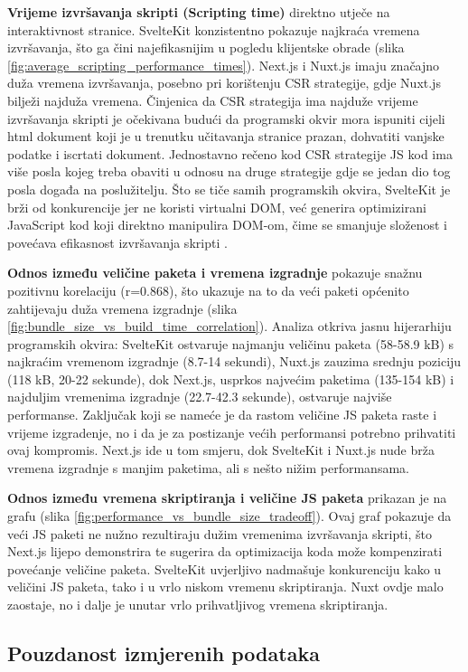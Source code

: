 \textbf{Vrijeme izvršavanja skripti (Scripting time)} direktno utječe na interaktivnost stranice. SvelteKit konzistentno pokazuje najkraća vremena izvršavanja, što ga čini najefikasnijim u pogledu klijentske obrade (slika \ref{fig:average_scripting_performance_times}). Next.js i Nuxt.js imaju značajno duža vremena izvršavanja, posebno pri korištenju CSR strategije, gdje Nuxt.js bilježi najduža vremena. Činjenica da CSR strategija ima najduže vrijeme izvršavanja skripti je očekivana budući da programski okvir mora ispuniti cijeli html dokument koji je u trenutku učitavanja stranice prazan, dohvatiti vanjske podatke i iscrtati dokument. Jednostavno rečeno kod CSR strategije JS kod ima više posla kojeg treba obaviti u odnosu na druge strategije gdje se jedan dio tog posla događa na poslužitelju. Što se tiče samih programskih okvira, SvelteKit je brži od konkurencije jer ne koristi virtualni DOM, već generira optimizirani JavaScript kod koji direktno manipulira DOM-om, čime se smanjuje složenost i povećava efikasnost izvršavanja skripti \cite{svelte2019reactivity}.


\textbf{Odnos između veličine paketa i vremena izgradnje} pokazuje snažnu pozitivnu korelaciju (r=0.868), što ukazuje na to da veći paketi općenito zahtijevaju duža vremena izgradnje (slika \ref{fig:bundle_size_vs_build_time_correlation}). Analiza otkriva jasnu hijerarhiju programskih okvira: SvelteKit ostvaruje najmanju veličinu paketa (58-58.9 kB) s najkraćim vremenom izgradnje (8.7-14 sekundi), Nuxt.js zauzima srednju poziciju (118 kB, 20-22 sekunde), dok Next.js, usprkos najvećim paketima (135-154 kB) i najduljim vremenima izgradnje (22.7-42.3 sekunde), ostvaruje najviše performanse.
Zaključak koji se nameće je da rastom veličine JS paketa raste i vrijeme izgradenje, no i da je za postizanje većih performansi potrebno prihvatiti ovaj kompromis. Next.js ide u tom smjeru, dok SvelteKit i Nuxt.js nude brža vremena izgradnje s manjim paketima, ali s nešto nižim performansama.

\textbf{Odnos između vremena skriptiranja i veličine JS paketa} prikazan je na grafu (slika \ref{fig:performance_vs_bundle_size_tradeoff}). Ovaj graf pokazuje da veći JS paketi ne nužno rezultiraju dužim vremenima izvršavanja skripti, što Next.js lijepo demonstrira te sugerira da optimizacija koda može kompenzirati povećanje veličine paketa. SvelteKit uvjerljivo nadmašuje konkurenciju kako u veličini JS paketa, tako i u vrlo niskom vremenu skriptiranja. Nuxt ovdje malo zaostaje, no i dalje je unutar vrlo prihvatljivog vremena skriptiranja.
\subsection{Pouzdanost izmjerenih podataka}

